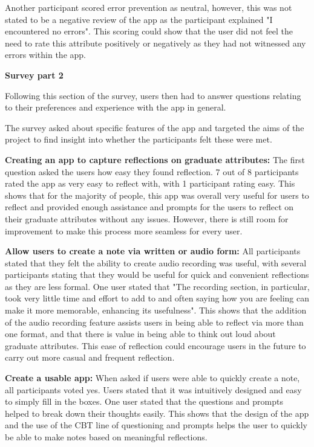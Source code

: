 \documentclass{l4proj}
\begin{document}
Another participant scored error prevention as neutral, however, this was not stated to be a negative review of the app as the participant explained "I encountered no errors". This scoring could show that the user did not feel the need to rate this attribute positively or negatively as they had not witnessed any errors within the app.

\textbf{Survey part 2}
 
Following this section of the survey, users then had to answer questions relating to their preferences and experience with the app in general. 

The survey asked about specific features of the app and targeted the aims of the project to find insight into whether the participants felt these were met.
 
\textbf{Creating an app to capture reflections on graduate attributes:} The first question asked the users how easy they found reflection. 7 out of 8 participants rated the app as very easy to reflect with, with 1 participant rating easy. This shows that for the majority of people, this app was overall very useful for users to reflect and provided enough assistance and prompts for the users to reflect on their graduate attributes without any issues. However, there is still room for improvement to make this process more seamless for every user.

\textbf{Allow users to create a note via written or audio form:} All participants stated that they felt the ability to create audio recording was useful, with several participants stating that they would be useful for quick and convenient reflections as they are less formal. One user stated that "The recording section, in particular, took very little time and effort to add to and often saying how you are feeling can make it more memorable, enhancing its usefulness". This shows that the addition of the audio recording feature assists users in being able to reflect via more than one format, and that there is value in being able to think out loud about graduate attributes. This ease of reflection could encourage users in the future to carry out more casual and frequent reflection. 

\textbf{Create a usable app:} When asked if users were able to quickly create a note, all participants voted yes. Users stated that it was intuitively designed and easy to simply fill in the boxes. One user stated that the questions and prompts helped to break down their thoughts easily. This shows that the design of the app and the use of the CBT line of questioning and prompts helps the user to quickly be able to make notes based on meaningful reflections.
\end{document}
